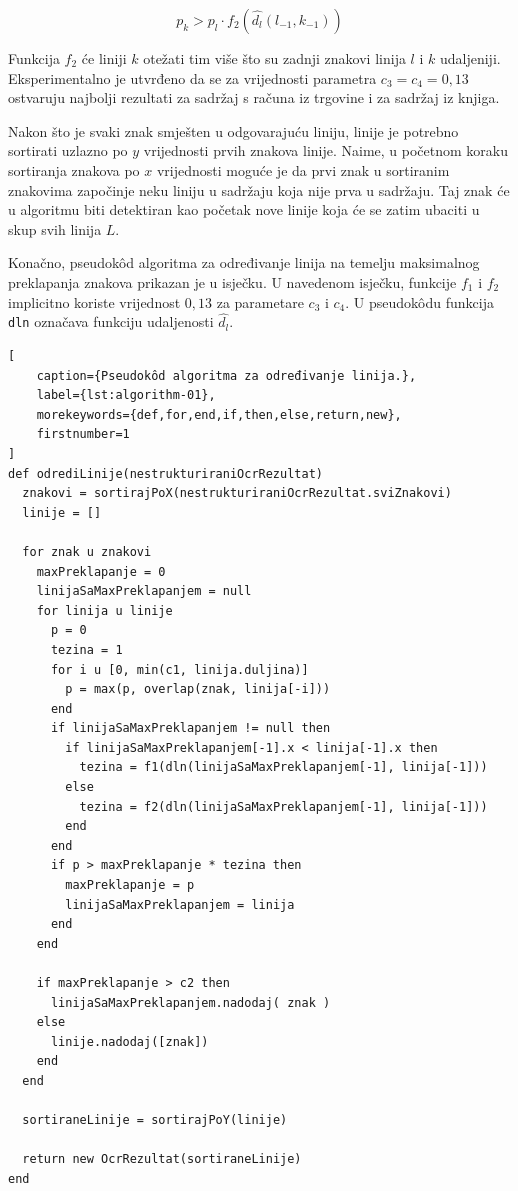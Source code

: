 \documentclass[times, utf8, zavrsni]{fer}
\begin{document}
\begin{equation}
    p_k > p_l \cdot f_2(\hat{d_l}(l_{-1},k_{-1}))
\end{equation}

Funkcija $f_2$ će liniji $k$ otežati tim više što su zadnji znakovi linija
$l$ i $k$ udaljeniji. Eksperimentalno je utvrđeno da se za vrijednosti parametra
$c_3 = c_4 = 0{,}13$ ostvaruju najbolji rezultati za sadržaj s računa iz
trgovine i za sadržaj iz knjiga.

Nakon što je svaki znak smješten u odgovarajuću liniju, linije je potrebno
sortirati uzlazno po $y$ vrijednosti prvih znakova linije. Naime, u početnom
koraku sortiranja znakova po $x$ vrijednosti moguće je da prvi znak
u sortiranim znakovima započinje neku liniju u sadržaju koja nije prva u
sadržaju. Taj znak će u algoritmu biti detektiran kao početak nove linije koja
će se zatim ubaciti u skup svih linija $L$.

Konačno, pseudokôd algoritma za određivanje linija na temelju maksimalnog
preklapanja znakova prikazan je u isječku. U navedenom isječku, funkcije $f_1$ i
$f_2$ implicitno koriste vrijednost $0{,}13$ za parametare $c_3$ i $c_4$.
U pseudokôdu funkcija \lstinline{dln} označava funkciju udaljenosti $\hat{d_l}$.

\pagebreak

\begin{lstlisting}[
    caption={Pseudokôd algoritma za određivanje linija.},
    label={lst:algorithm-01},
    morekeywords={def,for,end,if,then,else,return,new},
    firstnumber=1
]
def odrediLinije(nestrukturiraniOcrRezultat)
  znakovi = sortirajPoX(nestrukturiraniOcrRezultat.sviZnakovi)
  linije = []

  for znak u znakovi
    maxPreklapanje = 0
    linijaSaMaxPreklapanjem = null
    for linija u linije
      p = 0
      tezina = 1
      for i u [0, min(c1, linija.duljina)]
        p = max(p, overlap(znak, linija[-i]))
      end
      if linijaSaMaxPreklapanjem != null then
        if linijaSaMaxPreklapanjem[-1].x < linija[-1].x then
          tezina = f1(dln(linijaSaMaxPreklapanjem[-1], linija[-1]))
        else
          tezina = f2(dln(linijaSaMaxPreklapanjem[-1], linija[-1]))
        end
      end
      if p > maxPreklapanje * tezina then
        maxPreklapanje = p
        linijaSaMaxPreklapanjem = linija
      end
    end

    if maxPreklapanje > c2 then
      linijaSaMaxPreklapanjem.nadodaj( znak )
    else
      linije.nadodaj([znak])
    end
  end

  sortiraneLinije = sortirajPoY(linije)

  return new OcrRezultat(sortiraneLinije)
end
\end{lstlisting}
\end{document}
